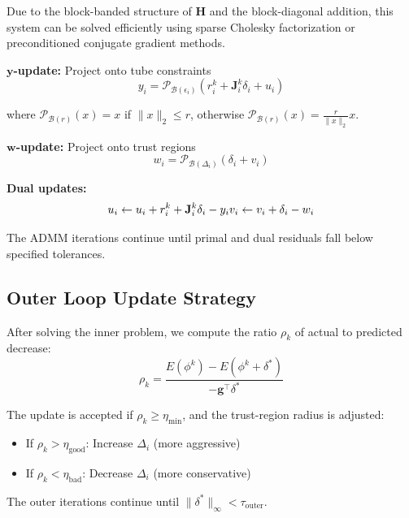 Due to the block-banded structure of $\mathbf{H}$ and the block-diagonal addition, this system can be solved efficiently using sparse Cholesky factorization or preconditioned conjugate gradient methods.

\textbf{$\mathbf{y}$-update:} Project onto tube constraints
\begin{equation}
\label{eq:y_update}
y_i = \mathcal{P}_{\mathcal{B}(\epsilon_i)}(r_i^k + \mathbf{J}_i^k \delta_i + u_i)
\end{equation}

where $\mathcal{P}_{\mathcal{B}(r)}(x) = x$ if $\|x\|_2 \leq r$, otherwise $\mathcal{P}_{\mathcal{B}(r)}(x) = \frac{r}{\|x\|_2}x$.

\textbf{$\mathbf{w}$-update:} Project onto trust regions
\begin{equation}
\label{eq:w_update}
w_i = \mathcal{P}_{\mathcal{B}(\Delta_i)}(\delta_i + v_i)
\end{equation}

\textbf{Dual updates:}
\begin{equation}
\label{eq:dual_updates}
u_i \leftarrow u_i + r_i^k + \mathbf{J}_i^k \delta_i - y_i \\
v_i \leftarrow v_i + \delta_i - w_i
\end{equation}

The ADMM iterations continue until primal and dual residuals fall below specified tolerances.

\subsection{Outer Loop Update Strategy}

After solving the inner problem, we compute the ratio $\rho_k$ of actual to predicted decrease:
\begin{equation}
\label{eq:rho}
\rho_k = \frac{E(\phi^k) - E(\phi^k + \delta^*)}{-\mathbf{g}^\top \delta^*}
\end{equation}

The update is accepted if $\rho_k \geq \eta_{\text{min}}$, and the trust-region radius is adjusted:
\begin{itemize}
\item If $\rho_k > \eta_{\text{good}}$: Increase $\Delta_i$ (more aggressive)
\item If $\rho_k < \eta_{\text{bad}}$: Decrease $\Delta_i$ (more conservative)
\end{itemize}

The outer iterations continue until $\|\delta^*\|_\infty < \tau_{\text{outer}}$.

